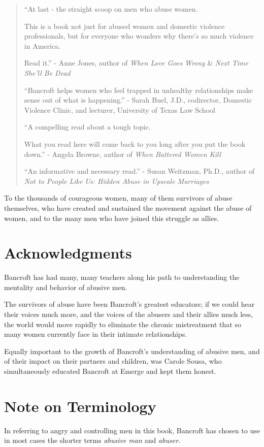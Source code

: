 \documentclass[oneside]{article}
\numberwithin{equation}{section}
\begin{document}
\begin{quotation}
    ``At last - the straight scoop on men who abuse women.
    
    This is a book not just for abused women and domestic violence professionals, but for everyone who wonders why there's so much violence in America.
    
    Read it.'' - Anne Jones, author of \textit{When Love Goes Wrong} \& \textit{Next Time She'll Be Dead}
    
    ``Bancroft helps women who feel trapped in unhealthy relationships make sense out of what is happening.'' - Sarah Buel, J.D., codirector, Domestic Violence Clinic, and lecturer, University of Texas Law School
    
    ``A compelling read about a tough topic.
    
    What you read here will come back to you long after you put the book down.'' - Angela Browne, author of \textit{When Battered Women Kill}
    
    ``An informative and necessary read.'' - Susan Weitzman, Ph.D., author of \textit{Not to People Like Us: Hidden Abuse in Upscale Marriages}
\end{quotation}
To the thousands of courageous women, many of them survivors of abuse themselves, who have created and sustained the movement against the abuse of women, and to the many men who have joined this struggle as allies.

\section*{Acknowledgments}
Bancroft has had many, many teachers along his path to understanding the mentality and behavior of abusive men.

The survivors of abuse have been Bancroft's greatest educators; if we could hear their voices much more, and the voices of the abusers and their allies much less, the world would move rapidly to eliminate the chronic mistreatment that so many women currently face in their intimate relationships.

%
Equally important to the growth of Bancroft's understanding of abusive men, and of their impact on their partners and children, was Carole Sousa, who simultaneously educated Bancroft at Emerge and kept them honest.


\section*{Note on Terminology}
In referring to angry and controlling men in this book, Bancroft has chosen to use in most cases the shorter terms \textit{abusive man} and \textit{abuser}.
\end{document}
